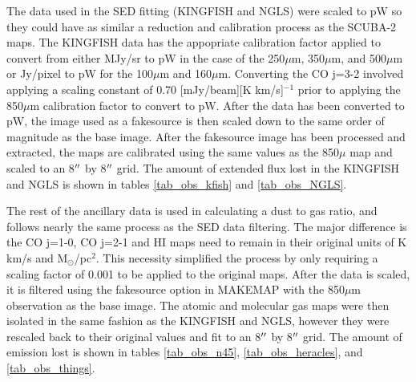 The data used in the SED fitting (KINGFISH and NGLS) were scaled to pW so they could have as similar a reduction and calibration process as the SCUBA-2 maps.   The KINGFISH data has the appopriate calibration factor applied to convert from either MJy/sr to pW in the case of the 250$\mu$m, 350$\mu$m, and 500$\mu$m or Jy/pixel to pW for the 100$\mu$m and 160$\mu$m.  Converting the CO j=3-2 involved applying a scaling constant of 0.70 [mJy/beam][K km/s]$^{-1}$ \citep{drabek2012} prior to applying the 850$\mu$m calibration factor to convert to pW.  After the data has been converted to pW, the image used as a fakesource is then scaled down to the same order of magnitude as the base image.  After the fakesource image has been processed and extracted, the maps are calibrated using the same values as the 850$\mu$ map and scaled to an 8$\mbox{$^{\prime\prime}$}$ by 8$\mbox{$^{\prime\prime}$}$ grid.  The amount of extended flux lost in the KINGFISH and NGLS is shown in tables \ref{tab_obs_kfish} and \ref{tab_obs_NGLS}.

The rest of the ancillary data is used in calculating a dust to gas ratio, and follows nearly the same process as the SED data filtering.  The major difference is the CO j=1-0, CO j=2-1 and HI maps need to remain in their original units of K km/s and M$_\odot$/pc$^2$.  This necessity simplified the process by only requiring a scaling factor of 0.001 to be applied to the original maps.  After the data is scaled, it is filtered using the fakesource option in MAKEMAP with the 850$\mu$m observation as the base image.  The atomic and molecular gas maps were then isolated in the same fashion as the KINGFISH and NGLS, however they were rescaled back to their original values and fit to an 8$\mbox{$^{\prime\prime}$}$ by 8$\mbox{$^{\prime\prime}$}$ grid.  The amount of emission lost is shown in tables \ref{tab_obs_n45}, \ref{tab_obs_heracles}, and \ref{tab_obs_things}.

